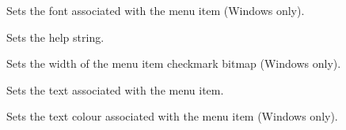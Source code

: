 
Sets the font associated with the menu item (Windows only).

\label{wxmenuitemsethelp}


Sets the help string.

\label{wxmenuitemsetmarginwidth}


Sets the width of the menu item checkmark bitmap (Windows only).

\label{wxmenuitemsetname}


Sets the text associated with the menu item.

\label{wxmenuitemsettextcolour}


Sets the text colour associated with the menu item (Windows only).



